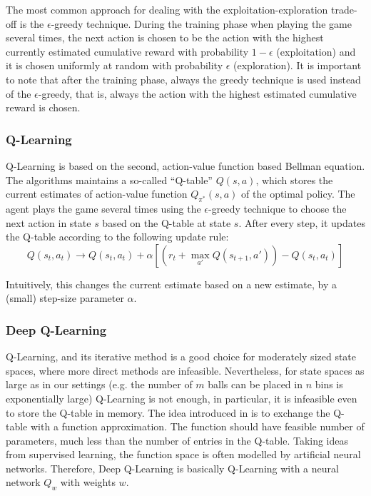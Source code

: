 The most common approach for dealing with the exploitation-exploration trade-off is the $\epsilon$-greedy technique. During the training phase when playing the game several times, the next action is chosen to be the action with the highest currently estimated cumulative reward with probability $1-\epsilon$ (exploitation) and it is chosen uniformly at random with probability $\epsilon$ (exploration). It is important to note that after the training phase, always the greedy technique is used instead of the $\epsilon$-greedy, that is, always the action with the highest estimated cumulative reward is chosen.



\subsubsection{Q-Learning}


Q-Learning \cite{watkins1989qlearning} is based on the second, action-value function based Bellman equation. The algorithms maintains a so-called ``Q-table'' $Q(s,a)$, which stores the current estimates of action-value function $Q_{\pi^*}(s,a)$ of the optimal policy. The agent plays the game several times using the $\epsilon$-greedy technique to choose the next action in state $s$ based on the Q-table at state $s$. After every step, it updates the Q-table according to the following update rule:
\begin{equation} \label{eq:q-learningUpdate}
Q(s_t,a_t) \longrightarrow Q(s_t,a_t) + \alpha[( r_t + \max_{a'} Q(s_{t+1}, a')) - Q(s_t,a_t)]
\end{equation}


Intuitively, this changes the current estimate based on a new estimate, by a (small) step-size parameter $\alpha$.


\subsubsection{Deep Q-Learning} \label{deepq-learning}


Q-Learning, and its iterative method is a good choice for moderately sized state spaces, where more direct methods are infeasible. Nevertheless, for state spaces as large as in our settings (e.g. the number of $m$ balls can be placed in $n$ bins is exponentially large) Q-Learning is not enough, in particular, it is infeasible even to store the Q-table in memory. The idea introduced in \cite{mnih2013DQN} is to exchange the Q-table with a function approximation. The function should have feasible number of parameters, much less than the number of entries in the Q-table. Taking ideas from supervised learning, the function space is often modelled by artificial neural networks. Therefore, Deep Q-Learning is basically Q-Learning with a neural network $Q_w$ with weights $w$.

